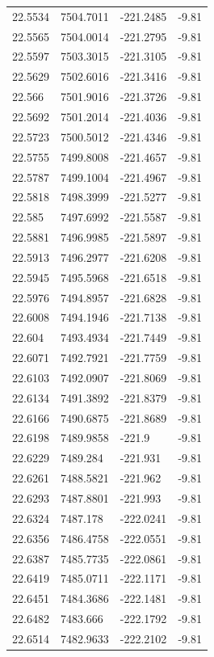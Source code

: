 \begin{table}[H]
\begin{tabular}{llll}
22.5534 & 7504.7011 & -221.2485 & -9.81 \\
22.5565 & 7504.0014 & -221.2795 & -9.81 \\
22.5597 & 7503.3015 & -221.3105 & -9.81 \\
22.5629 & 7502.6016 & -221.3416 & -9.81 \\
22.566 & 7501.9016 & -221.3726 & -9.81 \\
22.5692 & 7501.2014 & -221.4036 & -9.81 \\
22.5723 & 7500.5012 & -221.4346 & -9.81 \\
22.5755 & 7499.8008 & -221.4657 & -9.81 \\
22.5787 & 7499.1004 & -221.4967 & -9.81 \\
22.5818 & 7498.3999 & -221.5277 & -9.81 \\
22.585 & 7497.6992 & -221.5587 & -9.81 \\
22.5881 & 7496.9985 & -221.5897 & -9.81 \\
22.5913 & 7496.2977 & -221.6208 & -9.81 \\
22.5945 & 7495.5968 & -221.6518 & -9.81 \\
22.5976 & 7494.8957 & -221.6828 & -9.81 \\
22.6008 & 7494.1946 & -221.7138 & -9.81 \\
22.604 & 7493.4934 & -221.7449 & -9.81 \\
22.6071 & 7492.7921 & -221.7759 & -9.81 \\
22.6103 & 7492.0907 & -221.8069 & -9.81 \\
22.6134 & 7491.3892 & -221.8379 & -9.81 \\
22.6166 & 7490.6875 & -221.8689 & -9.81 \\
22.6198 & 7489.9858 & -221.9 & -9.81 \\
22.6229 & 7489.284 & -221.931 & -9.81 \\
22.6261 & 7488.5821 & -221.962 & -9.81 \\
22.6293 & 7487.8801 & -221.993 & -9.81 \\
22.6324 & 7487.178 & -222.0241 & -9.81 \\
22.6356 & 7486.4758 & -222.0551 & -9.81 \\
22.6387 & 7485.7735 & -222.0861 & -9.81 \\
22.6419 & 7485.0711 & -222.1171 & -9.81 \\
22.6451 & 7484.3686 & -222.1481 & -9.81 \\
22.6482 & 7483.666 & -222.1792 & -9.81 \\
22.6514 & 7482.9633 & -222.2102 & -9.81 \\

\end{tabular}
\end{table}
